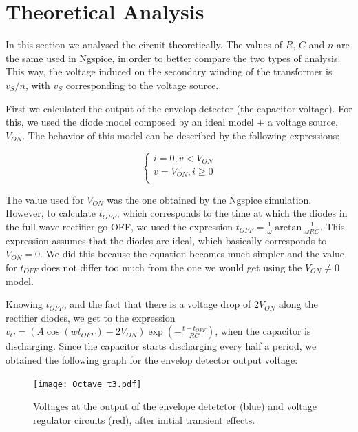 \newpage
\section{Theoretical Analysis}
\label{sec:analysis}

In this section we analysed the circuit theoretically. The values of $R$, $C$ and
 $n$ are the same used in Ngspice, in order to better compare the two types of analysis. 
 This way, the voltage induced on the secondary winding of the transformer is $v_{S}/n$, 
 with $v_{S}$ corresponding to the voltage source. 

First we calculated the output of the envelop detector (the capacitor voltage). For this,
 we used the diode model composed by an ideal model + a voltage source, $V_{ON}$. The behavior
  of this model can be described by the following expressions:

\begin{equation}
  \begin{cases}
    i=0, v<V_{ON} \\
    v=V_{ON}, i\geq 0 \\
    
  \end{cases}
\end{equation}

 The value used for $V_{ON}$ was the one obtained by the Ngspice simulation.
  However, to calculate $t_{OFF}$, which corresponds to the time at which the
   diodes in the full wave rectifier go OFF, we used the expression $t_{OFF}=\frac{1}{\omega}\arctan{\frac{1}{\omega RC}}$.
    This expression assumes that the diodes are ideal, which basically corresponds to $V_{ON}=0$.
     We did this because the equation becomes much simpler and the value for $t_{OFF}$ does
      not differ too much from the one we would get using the $V_{ON} \neq 0$ model.
 
 Knowing $t_{OFF}$, and the fact that there is a voltage drop of $2V_{ON}$ along the 
 rectifier diodes, we get to the expression $v_{C}=(A\cos{(wt_{OFF})}-2V_{ON})\exp{\left(-\frac{t-t_{OFF}}{RC}\right)}$, 
 when the capacitor is discharging. Since the capacitor starts discharging every half a period, we obtained 
 the following graph for the envelop detector output voltage:
 
 
 \begin{figure}[h] \centering
    \texttt{[image: Octave\_t3.pdf]}
    \caption{Voltages at the output of the envelope detetctor (blue) and voltage regulator circuits (red), after initial transient effects.}
    \label{fig:123}
  \end{figure}
 
